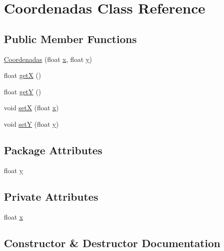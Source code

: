 \hypertarget{class_coordenadas}{}\section{Coordenadas Class Reference}
\label{class_coordenadas}
\subsection*{Public Member Functions}
\begin{DoxyCompactItemize}
\item 
\mbox{\hyperlink{class_coordenadas_a18a2e731d4a4b57ae2749d6616c8dd83}{Coordenadas}} (float \mbox{\hyperlink{class_coordenadas_a89574ed799dfc39e198c8e8096670bf1}{x}}, float \mbox{\hyperlink{class_coordenadas_a6b4555727809eb63ae63e171533476b8}{y}})
\item 
float \mbox{\hyperlink{class_coordenadas_a7b3fc725f9146220813dc0084fecc3ca}{getX}} ()
\item 
float \mbox{\hyperlink{class_coordenadas_aa10f46c8c62df3db3a05d4550f20b197}{getY}} ()
\item 
void \mbox{\hyperlink{class_coordenadas_a8b46e4301e0e9699d03e3e3886113c75}{setX}} (float \mbox{\hyperlink{class_coordenadas_a89574ed799dfc39e198c8e8096670bf1}{x}})
\item 
void \mbox{\hyperlink{class_coordenadas_a44fda770399a973175381ded0e88f1c0}{setY}} (float \mbox{\hyperlink{class_coordenadas_a6b4555727809eb63ae63e171533476b8}{y}})
\end{DoxyCompactItemize}
\subsection*{Package Attributes}
\begin{DoxyCompactItemize}
\item 
float \mbox{\hyperlink{class_coordenadas_a6b4555727809eb63ae63e171533476b8}{y}}
\end{DoxyCompactItemize}
\subsection*{Private Attributes}
\begin{DoxyCompactItemize}
\item 
float \mbox{\hyperlink{class_coordenadas_a89574ed799dfc39e198c8e8096670bf1}{x}}
\end{DoxyCompactItemize}


\subsection{Constructor \& Destructor Documentation}
\mbox{\label{class_coordenadas_a18a2e731d4a4b57ae2749d6616c8dd83}} 
